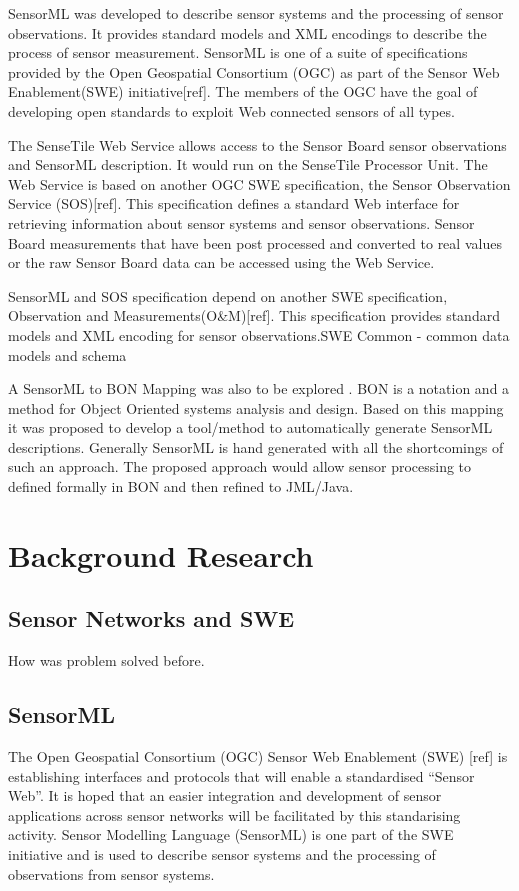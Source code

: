 \documentclass[]{final_report}
\begin{document}
SensorML was developed to describe sensor systems and the processing of sensor observations. It provides standard models and XML encodings to describe the process of sensor measurement. SensorML is one of a suite of specifications provided by the Open Geospatial Consortium (OGC) as part of the Sensor Web Enablement(SWE) initiative[ref]. The members of the OGC have the goal of developing open standards to exploit Web connected sensors of all types.

The SenseTile Web Service allows access to the Sensor Board sensor observations and SensorML description. It would run on the SenseTile Processor Unit.  The Web Service is based on another OGC SWE  specification, the Sensor Observation Service (SOS)[ref]. This specification defines a standard Web interface for retrieving information about sensor systems and sensor observations. Sensor Board measurements that have been post processed and converted to real values or the raw Sensor Board data can be accessed using the Web Service.

SensorML and SOS specification depend on another SWE specification, Observation and Measurements(O\&M)[ref]. This specification provides standard models and XML encoding for sensor observations.SWE Common - common data models and schema

A  SensorML to BON Mapping was also to be explored . BON\cite{BONref} is a notation and a method for Object Oriented systems analysis and design. Based on this mapping it was proposed to develop a tool/method to automatically generate SensorML descriptions. Generally SensorML is hand generated with all the shortcomings of such an approach. The proposed approach would allow sensor processing to defined formally in BON and then refined to JML/Java. 


\chapter{ Background Research}



\section{Sensor Networks and SWE}
How was problem solved before.


\section{SensorML}
The Open Geospatial Consortium (OGC) Sensor Web Enablement (SWE) [ref]  is establishing interfaces and protocols that will enable a standardised “Sensor Web”. It is hoped that an easier integration and development of sensor applications across sensor networks will be facilitated by this standarising activity. Sensor Modelling Language (SensorML) is one part of the SWE initiative and is used to describe sensor systems and the processing of observations from sensor systems.
\end{document}

